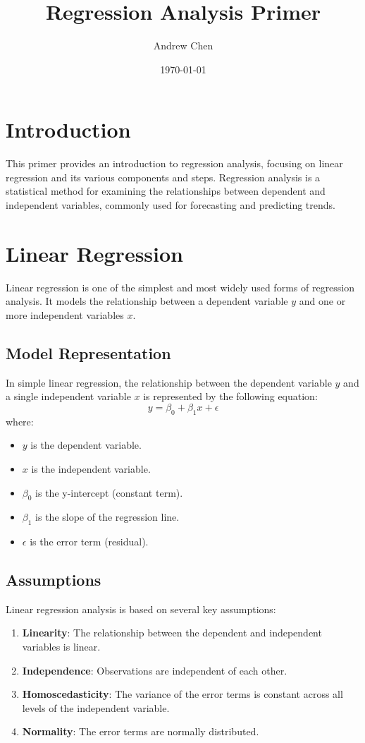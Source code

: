 \documentclass{article}
\title{Regression Analysis Primer}
\author{Andrew Chen}
\date{\today}
\begin{document}
\maketitle

\section{Introduction}
This primer provides an introduction to regression analysis, focusing on linear regression and its various components and steps. Regression analysis is a statistical method for examining the relationships between dependent and independent variables, commonly used for forecasting and predicting trends.

\section{Linear Regression}
Linear regression is one of the simplest and most widely used forms of regression analysis. It models the relationship between a dependent variable \( y \) and one or more independent variables \( x \).

\subsection{Model Representation}
In simple linear regression, the relationship between the dependent variable \( y \) and a single independent variable \( x \) is represented by the following equation:
\[
y = \beta_0 + \beta_1 x + \epsilon
\]
where:
\begin{itemize}
    \item \( y \) is the dependent variable.
    \item \( x \) is the independent variable.
    \item \( \beta_0 \) is the y-intercept (constant term).
    \item \( \beta_1 \) is the slope of the regression line.
    \item \( \epsilon \) is the error term (residual).
\end{itemize}

\subsection{Assumptions}
Linear regression analysis is based on several key assumptions:
\begin{enumerate}
    \item \textbf{Linearity}: The relationship between the dependent and independent variables is linear.
    \item \textbf{Independence}: Observations are independent of each other.
    \item \textbf{Homoscedasticity}: The variance of the error terms is constant across all levels of the independent variable.
    \item \textbf{Normality}: The error terms are normally distributed.
\end{enumerate}
\end{document}
